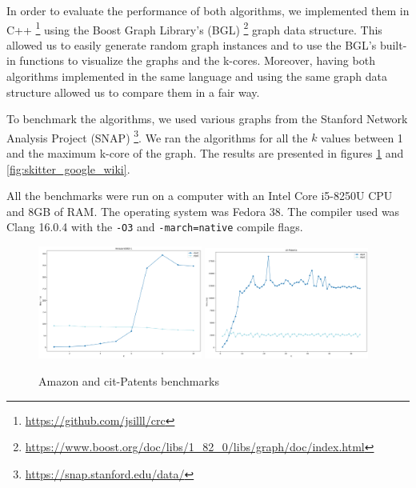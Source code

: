 \label{Evaluation}

In order to evaluate the performance of both algorithms, we implemented them in C++ \footnote{\url{https://github.com/jsilll/crc}} using the Boost Graph Library's (BGL) \footnote{\url{https://www.boost.org/doc/libs/1_82_0/libs/graph/doc/index.html}} graph data structure. This allowed us to easily generate random graph instances and to use the BGL's built-in functions to visualize the graphs and the k-cores. Moreover, having both algorithms implemented in the same language and using the same graph data structure allowed us to compare them in a fair way.

To benchmark the algorithms, we used various graphs from the Stanford Network Analysis Project (SNAP) \footnote{\url{https://snap.stanford.edu/data/}}. We ran the algorithms for all the $k$ values between 1 and the maximum k-core of the graph. The results are presented in figures \ref{fig:Amazon_CitPatents} and \ref{fig:skitter_google_wiki}.

All the benchmarks were run on a computer with an Intel Core i5-8250U CPU and 8GB of RAM. The operating system was Fedora 38. The compiler used was Clang 16.0.4 with the \texttt{-O3} and \texttt{-march=native} compile flags.
\begin{figure}[H]
    \centering
    \includegraphics[width=0.48\textwidth]{Figures/Amazon0302-1.png}
    \includegraphics[width=0.48\textwidth]{Figures/cit-Patents.png}
    \caption{Amazon and cit-Patents benchmarks}
    \label{fig:Amazon_CitPatents}
\end{figure}

